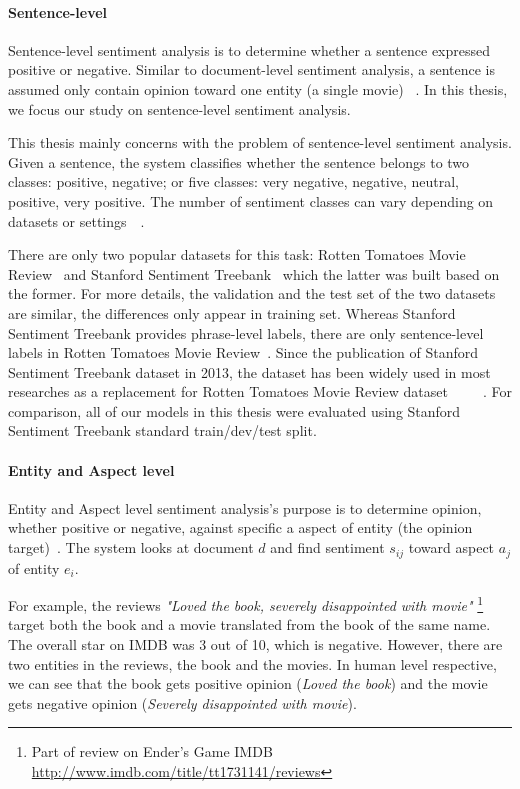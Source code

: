 \paragraph{Sentence-level}\label{sec:sent-level}
Sentence-level sentiment analysis is to determine whether a sentence expressed positive or negative. Similar to document-level sentiment analysis, a sentence is assumed only contain opinion toward one entity (a single movie) ~\cite{liu2012sentiment}.
In this thesis, we focus our study on sentence-level sentiment analysis.

This thesis mainly concerns with the problem of sentence-level sentiment analysis.
Given a sentence, the system classifies whether the sentence belongs to two classes: positive, negative; or five classes: very negative, negative, neutral, positive, very positive.
The number of sentiment classes can vary depending on datasets or settings~\cite{Rotten-Tomato}~\cite{socher2013recursive}.

There are only two popular datasets for this task: Rotten Tomatoes Movie Review~\cite{Rotten-Tomato} and Stanford Sentiment Treebank~\cite{socher2013recursive} which the latter was built based on the former.
For more details, the validation and the test set of the two datasets are similar, the differences only appear in training set.
Whereas Stanford Sentiment Treebank provides phrase-level labels, there are only sentence-level labels in Rotten Tomatoes Movie Review~\cite{socher2013recursive}.
Since the publication of Stanford Sentiment Treebank dataset in 2013, the dataset has been widely used in most researches as a replacement for Rotten Tomatoes Movie Review dataset~\cite{treeLSTM}~\cite{KimCNN}~\cite{cnn-rnn}~\cite{2-layer-cnn}~\cite{socher2013recursive}.
For comparison, all of our models in this thesis were evaluated using Stanford Sentiment Treebank standard train/dev/test split.

\paragraph{Entity and Aspect level}
Entity and Aspect level sentiment analysis's purpose is to determine opinion, whether positive or negative, against specific a aspect of entity (the opinion target)~\cite{liu2012sentiment}. The system looks at document $d$ and find sentiment $s_{ij}$ toward aspect $a_{j}$ of entity $e_{i}$.

For example, the reviews \textit{"Loved the book, severely disappointed with movie"} \footnote{Part of review on Ender's Game IMDB \url{http://www.imdb.com/title/tt1731141/reviews}} target both the book and a movie translated from the book of the same name. The overall star on IMDB was 3 out of 10, which is negative. However, there are two entities in the reviews, the book and the movies. In human level respective, we can see that the book gets positive opinion (\textit{Loved the book}) and the movie gets negative opinion (\textit{Severely disappointed with movie}).

